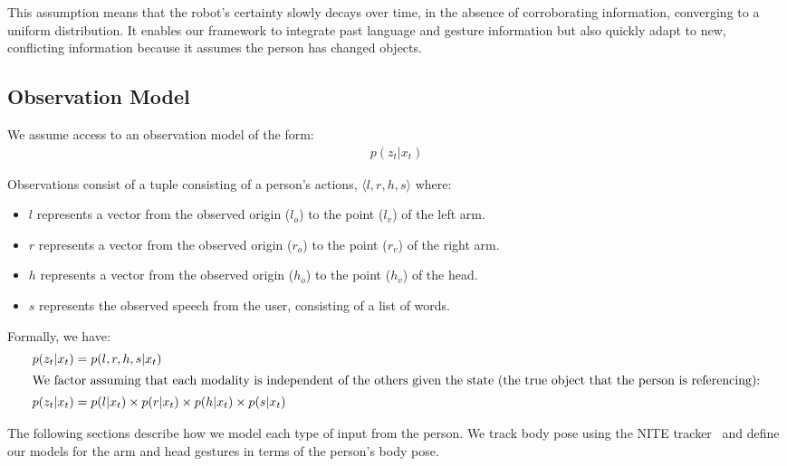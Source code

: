 \documentclass[letterpaper, 10 pt, conference]{ieeeconf}
\begin{document}
This assumption means that the robot's certainty slowly decays over
time, in the absence of corroborating information, converging to a
uniform distribution.  It enables our framework to integrate past
language and gesture information but also quickly adapt to new,
conflicting information because it assumes the person has changed
objects.


\subsection{Observation Model}

We assume access to an observation model of the form:
\begin{align}
p(z_t | x_t)
\end{align}

Observations consist of a tuple consisting of a person's actions,
$\langle l, r, h, s\rangle $ where:
\begin{itemize}
	\item $l$ represents a vector from the observed origin ($l_o$) to the point ($l_v$) of the left arm.
	\item $r$ represents a vector from the observed origin ($r_o$) to the point ($r_v$) of the right arm.
	\item $h$ represents a vector from the observed origin ($h_o$) to the point ($h_v$) of the head.
	\item $s$ represents the observed speech from the user,
          consisting of a list of words.
	\end{itemize}

Formally, we have:
\begin{align}
p(z_t | x_t) &= p(l, r, h, s | x_t)\\
\intertext{We factor assuming that each modality is independent of the others given the state (the true object that the person is referencing):}
p(z_t | x_t) &= p(l | x_t) \times p(r | x_t) \times p(h | x_t) \times p(s | x_t)
\end{align}

\noindent The following sections describe how we model each type of
input from the person.  We track body pose using the NITE
tracker~\citep{openni} and define our models for the arm and head
gestures in terms of the person's body pose.
\end{document}
